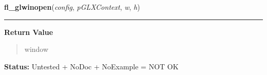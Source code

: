     \label{xformslib:library:fl_glwinopen}

    \vspace{0.5ex}

\hspace{.8\funcindent}\begin{boxedminipage}{\funcwidth}

    \raggedright \textbf{fl\_glwinopen}(\textit{config}, \textit{pGLXContext}, \textit{w}, \textit{h})

    \vspace{-1.5ex}

    \rule{\textwidth}{0.5\fboxrule}
\setlength{\parskip}{2ex}
\setlength{\parskip}{1ex}
      \textbf{Return Value}
    \vspace{-1ex}

      \begin{quote}
      window

      \end{quote}

\textbf{Status:} Untested + NoDoc + NoExample = NOT OK



    \end{boxedminipage}

    \label{xformslib:library:fl_create_chart}

    \vspace{0.5ex}

